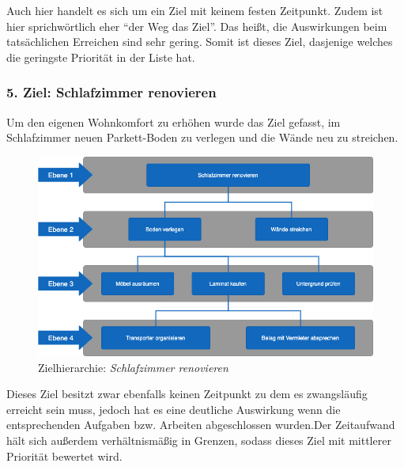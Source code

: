 Auch hier handelt es sich um ein Ziel mit keinem festen Zeitpunkt. Zudem ist hier sprichwörtlich eher “der Weg das Ziel”. Das heißt, die Auswirkungen beim tatsächlichen Erreichen sind sehr gering. Somit ist dieses Ziel, dasjenige welches die geringste Priorität in der Liste hat.

\subsubsection{5. Ziel: Schlafzimmer renovieren}
Um den eigenen Wohnkomfort zu erhöhen wurde das Ziel gefasst, im Schlafzimmer neuen Parkett-Boden zu verlegen und die Wände neu zu streichen.

\begin{figure}[htb]
	\includegraphics[width=\textwidth]{gfx/renovieren}
	\caption{Zielhierarchie: \textit{Schlafzimmer renovieren}}
\end{figure}

Dieses Ziel besitzt zwar ebenfalls keinen Zeitpunkt zu dem es zwangsläufig erreicht sein muss, jedoch hat es eine deutliche Auswirkung wenn die entsprechenden Aufgaben bzw. Arbeiten abgeschlossen wurden.Der Zeitaufwand hält sich außerdem verhältnismäßig in Grenzen, sodass dieses Ziel mit mittlerer Priorität bewertet wird.
